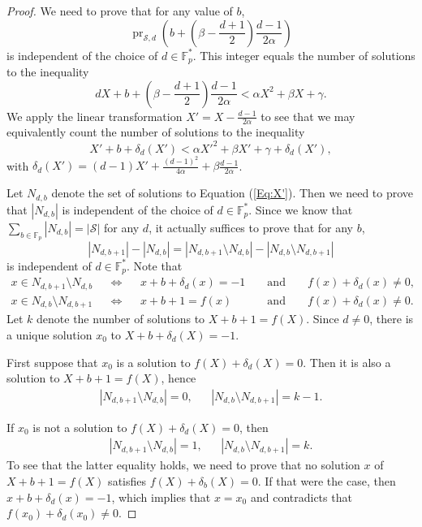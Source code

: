\documentclass[a4paper, 12pt]{article}
\theoremstyle{definition}
\newcommand{\FF}{\mathbb F}
\newcommand{\ms}{\mathcal S}
\DeclareMathOperator{\pr}{pr}
\begin{document}
\begin{proof}
 We need to prove that for any value of $b$,
 \[
  \pr_{\ms,d}\left( b + \left(\beta-\frac{d+1}2\right)\frac{d-1}{2\alpha} \right)
 \]
 is independent of the choice of $d \in \FF_p^*$.
 This integer equals the number of solutions to the inequality
 \[
  dX + b + \left(\beta-\frac{d+1}2\right)\frac{d-1}{2\alpha} < \alpha X^2 + \beta X + \gamma.
 \]
 We apply the linear transformation $X' = X - \frac{d-1}{2\alpha}$ to see that we may equivalently count the number of solutions to the inequality
 \begin{equation}
  \label{Eq:X'}
  X' + b + \delta_d(X') < \alpha X'^2 + \beta X' + \gamma + \delta_d(X'),
 \end{equation}
 with $\delta_d(X') = (d-1) X' + \frac{(d-1)^2}{4\alpha} + \beta \frac{d-1}{2\alpha}$.
 
 Let $N_{d,b}$ denote the set of solutions to Equation (\ref{Eq:X'}).
 Then we need to prove that $|N_{d,b}|$ is independent of the choice of $d \in \FF_p^*$.
 Since we know that $\sum_{b \in \FF_p} |N_{d,b}| = |\ms|$ for any $d$, it actually suffices to prove that for any $b$,
 \[
  |N_{d,b+1}|-|N_{d,b}| = |N_{d,b+1} \setminus N_{d,b}| - |N_{d,b} \setminus N_{d,b+1}|
 \]
 is independent of $d \in \FF_p^*$.
 Note that
 \begin{align*}
  x \in N_{d,b+1} \setminus N_{d,b} && \iff && x+b+\delta_d(x)=-1 && \text{ and } && f(x) + \delta_d(x) \neq 0, \\
  x \in N_{d,b} \setminus N_{d,b+1} && \iff && x+b+1=f(x) && \text{ and } && f(x) + \delta_d(x) \neq 0.
 \end{align*}
 Let $k$ denote the number of solutions to $X+b+1 = f(X)$.
 Since $d \neq 0$, there is a unique solution $x_0$ to $X + b + \delta_d(X) = -1$.
 
 First suppose that $x_0$ is a solution to $f(X) + \delta_d(X) = 0$.
 Then it is also a solution to $X+b+1 = f(X)$, hence
 \begin{align*}
  |N_{d,b+1} \setminus N_{d,b}| = 0, &&
  |N_{d,b} \setminus N_{d,b+1}| = k-1.
 \end{align*}

 If $x_0$ is not a solution to $f(X) + \delta_d(X) = 0$, then
 \begin{align*}
  |N_{d,b+1} \setminus N_{d,b}| = 1, &&
  |N_{d,b} \setminus N_{d,b+1}| = k.
 \end{align*}
 To see that the latter equality holds, we need to prove that no solution $x$ of $X+b+1 = f(X)$ satisfies $f(X) + \delta_b(X) = 0$.
 If that were the case, then $x + b + \delta_d(x) = -1$, which implies that $x = x_0$ and contradicts that $f(x_0) + \delta_d(x_0) \neq 0$.


\end{proof}
\end{document}
